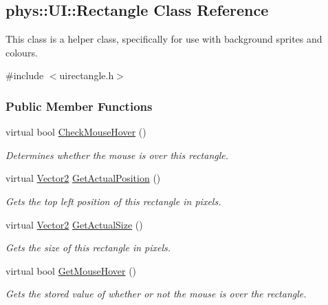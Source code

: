 \hypertarget{classphys_1_1UI_1_1Rectangle}{
\subsection{phys::UI::Rectangle Class Reference}
\label{classphys_1_1UI_1_1Rectangle}
}


This class is a helper class, specifically for use with background sprites and colours.  




{\ttfamily \#include $<$uirectangle.h$>$}

\subsubsection*{Public Member Functions}
\begin{DoxyCompactItemize}
\item 
virtual bool \hyperlink{classphys_1_1UI_1_1Rectangle_a246070a93416c2c50d63720b354154d7}{CheckMouseHover} ()
\begin{DoxyCompactList}\small\item\em Determines whether the mouse is over this rectangle. \item\end{DoxyCompactList}\item 
virtual \hyperlink{classphys_1_1Vector2}{Vector2} \hyperlink{classphys_1_1UI_1_1Rectangle_a976f977ee23e805b4a193fc0f9e8392f}{GetActualPosition} ()
\begin{DoxyCompactList}\small\item\em Gets the top left position of this rectangle in pixels. \item\end{DoxyCompactList}\item 
virtual \hyperlink{classphys_1_1Vector2}{Vector2} \hyperlink{classphys_1_1UI_1_1Rectangle_ae29501765e3af7eac37d5ac581e77b24}{GetActualSize} ()
\begin{DoxyCompactList}\small\item\em Gets the size of this rectangle in pixels. \item\end{DoxyCompactList}\item 
virtual bool \hyperlink{classphys_1_1UI_1_1Rectangle_a20903adb6d1b8650d73774190a2b9c57}{GetMouseHover} ()
\begin{DoxyCompactList}\small\item\em Gets the stored value of whether or not the mouse is over the rectangle. \item\end{DoxyCompactList}\item 

\end{DoxyCompactItemize}
